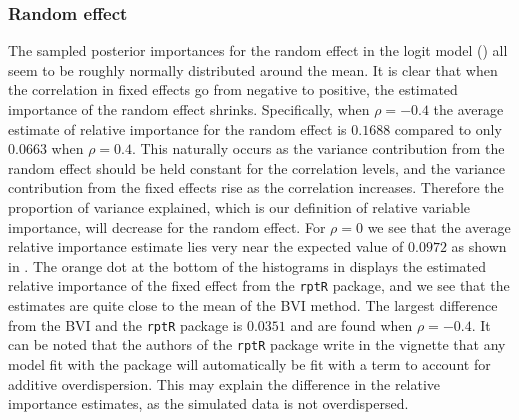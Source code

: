 \subsubsection{Random effect}
The sampled posterior importances for the random effect in the logit model () all seem to be roughly normally distributed around the mean. It is clear that when the correlation in fixed effects go from negative to positive, the estimated importance of the random effect shrinks. Specifically, when $\rho=-0.4$ the average estimate of relative importance for the random effect is $0.1688$ compared to only $0.0663$ when $\rho=0.4$. This naturally occurs as the variance contribution from the random effect should be held constant for the correlation levels, and the variance contribution from the fixed effects rise as the correlation increases. Therefore the proportion of variance explained, which is our definition of relative variable importance, will decrease for the random effect. For $\rho=0$ we see that the average relative importance estimate lies very near the expected value of $0.0972$ as shown in . The orange dot at the bottom of the histograms in  displays the estimated relative importance of the fixed effect from the \texttt{rptR} package, and we see that the estimates are quite close to the mean of the BVI method. The largest difference from the BVI and the \texttt{rptR} package is $0.0351$ and are found when $\rho=-0.4$. It can be noted that the authors of the \texttt{rptR} package \citep{Stoffel2017rptR} write in the vignette that any model fit with the package will automatically be fit with a term to account for additive overdispersion. This may explain the difference in the relative importance estimates, as the simulated data is not overdispersed.
\\
\\
